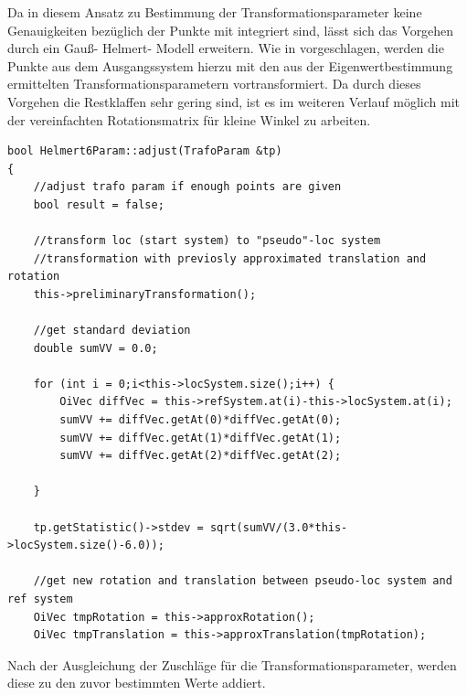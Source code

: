 Da in diesem Ansatz zu Bestimmung der Transformationsparameter keine Genauigkeiten bezüglich der Punkte mit integriert sind, lässt sich das Vorgehen durch ein Gauß- Helmert- Modell erweitern. Wie in \cite{Drixler1993} vorgeschlagen, werden die Punkte aus dem Ausgangssystem hierzu mit den aus der Eigenwertbestimmung ermittelten Transformationsparametern vortransformiert. Da durch dieses Vorgehen die Restklaffen sehr gering sind, ist es im weiteren Verlauf möglich mit der vereinfachten Rotationsmatrix für kleine Winkel zu arbeiten.
\begin{lstlisting}[caption={Ausschnitte aus bool adjust(TrafoParam \&tp)},captionpos=t]
bool Helmert6Param::adjust(TrafoParam &tp)
{
    //adjust trafo param if enough points are given
    bool result = false;

    //transform loc (start system) to "pseudo"-loc system
    //transformation with previosly approximated translation and rotation
    this->preliminaryTransformation();

    //get standard deviation
    double sumVV = 0.0;

    for (int i = 0;i<this->locSystem.size();i++) {
        OiVec diffVec = this->refSystem.at(i)-this->locSystem.at(i);
        sumVV += diffVec.getAt(0)*diffVec.getAt(0);
        sumVV += diffVec.getAt(1)*diffVec.getAt(1);
        sumVV += diffVec.getAt(2)*diffVec.getAt(2);

    }

    tp.getStatistic()->stdev = sqrt(sumVV/(3.0*this->locSystem.size()-6.0));

    //get new rotation and translation between pseudo-loc system and ref system
    OiVec tmpRotation = this->approxRotation();
    OiVec tmpTranslation = this->approxTranslation(tmpRotation);
\end{lstlisting}

Nach der Ausgleichung der Zuschläge für die Transformationsparameter, werden diese zu den zuvor bestimmten Werte addiert.

